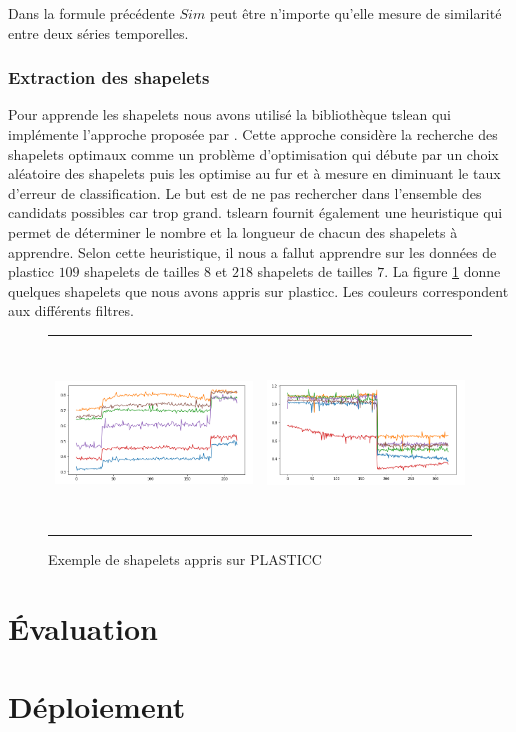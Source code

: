 Dans la formule précédente $ Sim $ peut être n'importe qu'elle mesure de similarité entre deux séries temporelles. 

\subsubsection{Extraction des shapelets}
Pour apprende les shapelets nous avons utilisé la bibliothèque tslean\citep{tslearn} qui implémente l'approche proposée par \citet{grabocka2014learning}. Cette approche considère la recherche des shapelets optimaux comme un problème d'optimisation qui débute par un choix aléatoire des shapelets puis les optimise au fur et à mesure en diminuant le taux d'erreur de classification. Le but est de ne pas rechercher dans l'ensemble des candidats possibles car trop grand. tslearn fournit également une heuristique qui permet de déterminer le nombre et la longueur de chacun des shapelets à apprendre. Selon cette heuristique, il nous a fallut apprendre sur les données de plasticc $ 109 $ shapelets de tailles $ 8 $ et $ 218 $ shapelets de tailles $ 7 $. La figure \ref{fig:shapelet_example} donne quelques shapelets que nous avons appris sur plasticc. Les couleurs correspondent aux différents filtres.

\begin{figure}[!h]
    \centering
    \begin{tabular}{c|c}
         \includegraphics[width=7cm,height=5cm]{report/figures/shapelet.png} & \includegraphics[width=7cm,height=5cm]{report/figures/shapelet2.png}
    \end{tabular}
    \caption{Exemple de shapelets appris sur PLASTICC}
    \label{fig:shapelet_example}
\end{figure}

\section{Évaluation}

\section{Déploiement}